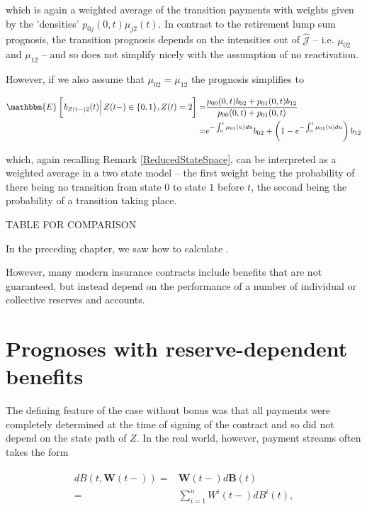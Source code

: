 \documentclass{book}
\newcommand{\1}[1]{\mathbbm{1}_{\left\lbrace #1 \right\rbrace}}
\newcommand{\econd}[2][def]{\mathbbm{E} \left[ \left. #1 \right| #2 \right]}
\theoremstyle{break}
\theoremstyle{remark}
\numberwithin{equation}{section}
\begin{document}
\begin{example}
which is again a weighted average of the transition payments with weights given by the 'densities' $p_{0j}(0,t) \mu_{j2}(t)$. In contrast to the retirement lump sum prognosis, the transition prognosis depends on the intensities out of $\hat{\mathcal{J}}$ -- i.e. $\mu_{02}$ and $\mu_{12}$ -- and so does not simplify nicely with the assumption of no reactivation.

However, if we also assume that $\mu_{02}=\mu_{12}$ the prognosis simplifies to

\begin{align*}
    \econd[b_{Z(t-)2}(t)]{Z(t-) \in \{ 0,1 \}, Z(t)=2} =&\frac{p_{00}(0,t) b_{02} + p_{01}(0,t) b_{12}}{p_{00}(0,t) + p_{01}(0,t)} \\
    =& e^{-\int_0^t \mu_{01}(u)du} b_{02} + \left(1 - e^{-\int_0^t \mu_{01}(u)du} \right) b_{12}
\end{align*}

which, again recalling Remark \ref{ReducedStateSpace}, can be interpreted as a weighted average in a two state model -- the first weight being the probability of there being no transition from state $0$ to state $1$ before $t$, the second being the probability of a transition taking place.

TABLE FOR COMPARISON
\end{example}

In the preceding chapter, we saw how to calculate .

However, many modern insurance contracts include benefits that are not guaranteed, but instead depend on the performance of a number of individual or collective reserves and accounts. 

\newpage

\chapter{Prognoses with reserve-dependent benefits} \label{ChapReserveDepBen}

The defining feature of the case without bonus was that all payments were completely determined at the time of signing of the contract and so did not depend on the state path of $Z$. In the real world, however, payment streams often takes the form

\begin{align} \label{TotalPaymentStream}
\begin{split}
	dB(t,\textbf{W}(t-)) =& \textbf{W}(t-) d\textbf{B}(t) \\
=& \sum_{i=1}^{n} W^i(t-) dB^i(t),
\end{split}
\end{align}
\end{document}
